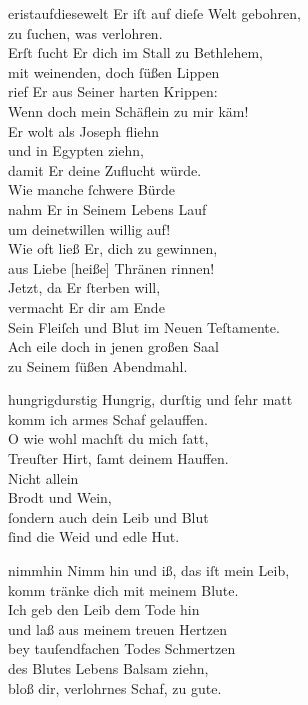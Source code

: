 \documentclass[tocstyle=ref-genre]{ees}
\begin{document}
{\begin{movement}{eristaufdiesewelt}
  Er iſt auf dieſe Welt gebohren,\\
  zu ſuchen, was verlohren.\\
  Erſt ſucht Er dich im Stall zu Bethlehem,\\
  mit weinenden, doch ſüßen Lippen\\
  rief Er aus Seiner harten Krippen:\\
  Wenn doch mein Schäflein zu mir käm!\\
  Er wolt als Joseph fliehn\\
  und in Egypten ziehn,\\
  damit Er deine Zuflucht würde.\\
  Wie manche ſchwere Bürde\\
  nahm Er in Seinem Lebens Lauf\\
  um deinetwillen willig auf!\\
  Wie oft ließ Er, dich zu gewinnen,\\
  aus Liebe [heiße] Thränen rinnen!\\
  Jetzt, da Er ſterben will,\\
  vermacht Er dir am Ende\\
  Sein Fleiſch und Blut im Neuen Teſtamente.\\
  Ach eile doch in jenen großen Saal\\
  zu Seinem ſüßen Abendmahl.
\end{movement}

\begin{movement}{hungrigdurstig}
  \voice[Coro]
  Hungrig, durſtig und ſehr matt\\
  komm ich armes Schaf gelauffen.\\
  O wie wohl machſt du mich ſatt,\\
  Treuſter Hirt, ſamt deinem Hauffen.\\
  Nicht allein\\
  Brodt und Wein,\\
  ſondern auch dein Leib und Blut\\
  ſind die Weid und edle Hut.
\end{movement}

\begin{movement}{nimmhin}
  Nimm hin und iß, das iſt mein Leib,\\
  komm tränke dich mit meinem Blute.\\
  Ich geb den Leib dem Tode hin\\
  und laß aus meinem treuen Hertzen\\
  bey tauſendfachen Todes Schmertzen\\
  des Blutes Lebens Balsam ziehn,\\
  bloß dir, verlohrnes Schaf, zu gute.
\end{movement}

}
\end{document}
